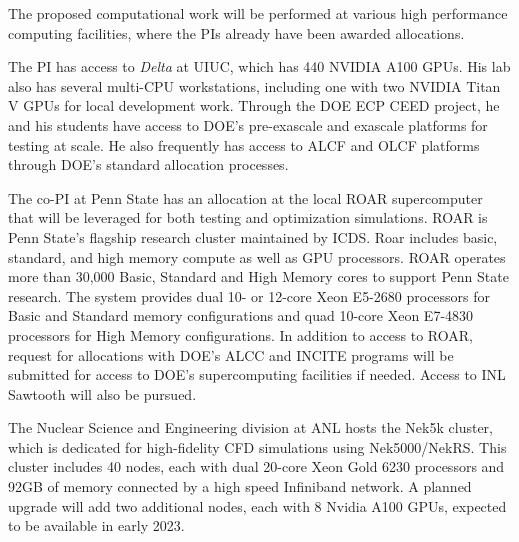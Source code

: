 

\vspace{.05in}

\noindent
The proposed computational work will be performed at various high performance
computing facilities, where the PIs already have been awarded allocations.

The PI has access to {\em Delta} at UIUC, which has 440 NVIDIA A100 GPUs.  His
lab also has several multi-CPU workstations, including one with two NVIDIA
Titan V GPUs for local development work.  Through the DOE ECP CEED project, he
and his students have access to DOE's pre-exascale and exascale platforms for
testing at scale.  He also frequently has access to ALCF and OLCF platforms
through DOE's standard allocation processes.

The co-PI at Penn State has an allocation at the local ROAR supercomputer that
will be leveraged for both testing and optimization simulations. ROAR is Penn
State’s flagship research cluster maintained by ICDS. Roar includes basic,
standard, and high memory compute as well as GPU processors. ROAR operates more
than 30,000 Basic, Standard and High Memory cores to support Penn State
research. The system provides dual 10- or 12-core Xeon E5-2680 processors for
Basic and Standard memory configurations and quad 10-core Xeon E7-4830
processors for High Memory configurations. In addition to access to ROAR,
request for allocations with DOE’s ALCC and INCITE programs will be submitted
for access to DOE’s supercomputing facilities if needed. Access to INL Sawtooth
will also be pursued.

The Nuclear Science and Engineering division at ANL hosts the Nek5k cluster,
which is dedicated for high-fidelity CFD simulations using Nek5000/NekRS. This
cluster includes 40 nodes, each with dual 20-core Xeon Gold 6230 processors and
92GB of memory connected by a high speed Infiniband network. A planned upgrade
will add two additional nodes, each with 8 Nvidia A100 GPUs, expected to be
available in early 2023.
\\
